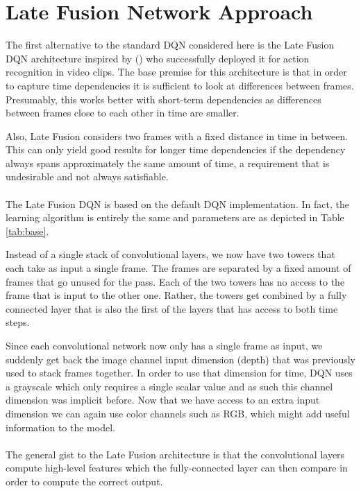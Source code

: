 \section{Late Fusion Network Approach}
\label{sec:late_fusion_network_approach}
The first alternative to the standard DQN
considered here is
the Late Fusion DQN architecture
inspired by \citeauthor{Karpathy2014} (\citeyear{Karpathy2014})
who successfully deployed it for
action recognition in video clips.
The base premise for this architecture
is that in order to capture time dependencies
it is sufficient to look at differences
between frames.
Presumably,
this works better with short-term dependencies
as differences between frames close to each other in time
are smaller.

Also, Late Fusion
considers two frames with a fixed distance in time in between.
This can only yield good results for longer time dependencies
if the dependency always spans approximately the same amount of time,
a requirement that is undesirable
and not always satisfiable.

\paragraph{}
The Late Fusion DQN is based on the default DQN implementation.
In fact, the learning algorithm is entirely the same
and parameters are as depicted in Table \ref{tab:base}.

Instead of a single stack of convolutional layers,
we now have two towers that each take as input a single frame.
The frames are separated by a fixed amount of frames
that go unused for the pass.
Each of the two towers has no access to the frame
that is input to the other one.
Rather, the towers get combined by a fully connected layer
that is also the first of the layers that has access
to both time steps.

Since each convolutional network now only has a single frame as input,
we suddenly get back the image channel input dimension (depth)
that was previously used to stack frames together.
In order to use that dimension for time,
DQN uses a grayscale
which only requires a single scalar value
and as such this channel dimension was implicit before.
Now that we have access to an extra input dimension
we can again use color channels
such as RGB,
which might add useful information to the model.

\paragraph{}
The general gist to the Late Fusion architecture
is that the convolutional layers
compute high-level features
which the fully-connected layer can then compare
in order to compute the correct output.

